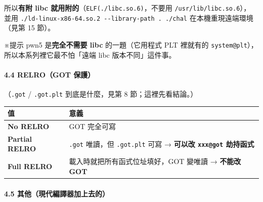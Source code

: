 \documentclass[10pt,a4paper]{article}
\newcounter{none}
\renewenvironment{quote}{%
  \begin{mdframed}[linewidth=0pt,innerleftmargin=0pt,innerrightmargin=0pt,
    innerbottommargin=0pt,innertopmargin=0pt,skipabove=0.55em,skipbelow=0.55em,
    leftmargin=0.9em,rightmargin=0.4em,startcode={\color{quotebar}\vrule width 2.6pt},%
    endcode={}]%
  \itshape\color{black}%
}{%
  \end{mdframed}%
}
\begin{document}
所以\textbf{有附 libc
就用附的}（\texttt{ELF(\textquotesingle{}\allowbreak{}./\allowbreak{}libc.\allowbreak{}so.\allowbreak{}6\textquotesingle{}\allowbreak{})}，不要用
\texttt{/\allowbreak{}usr/\allowbreak{}lib/\allowbreak{}libc.\allowbreak{}so.\allowbreak{}6}）， 並用
\texttt{./\allowbreak{}ld-\allowbreak{}linux-\allowbreak{}x86-\allowbreak{}64.\allowbreak{}so.\allowbreak{}2\ \allowbreak{}-\allowbreak{}\/\allowbreak{}-\allowbreak{}library-\allowbreak{}path\ \allowbreak{}.\allowbreak{}\ \allowbreak{}./\allowbreak{}chal}
在本機重現遠端環境（見第 15 節）。

\begin{quote}
※提示 pwn5 是\textbf{完全不需要 libc} 的一題（它用程式 PLT 裡就有的
\texttt{system@plt}）， 所以本系列裡它最不怕「遠端 libc
版本不同」這件事。
\end{quote}

\paragraph{4.4 RELRO（GOT 保護）}\label{relrogot-ux4fddux8b77}

（\texttt{.\allowbreak{}got} / \texttt{.\allowbreak{}got.\allowbreak{}plt} 到底是什麼，見第 8
節；這裡先看結論。）

{\def\LTcaptype{none} %
\begin{longtable}[]{@{}
  >{\raggedright\arraybackslash}p{}
  >{\raggedright\arraybackslash}p{}@{}}
\toprule\noalign{}
\begin{minipage}[b]{\linewidth}\raggedright
值
\end{minipage} & \begin{minipage}[b]{\linewidth}\raggedright
意義
\end{minipage} \\
\midrule\noalign{}
\endhead
\bottomrule\noalign{}
\endlastfoot
\textbf{No RELRO} & GOT 完全可寫 \\
\textbf{Partial RELRO} & \texttt{.\allowbreak{}got} 唯讀，但 \texttt{.\allowbreak{}got.\allowbreak{}plt} 可寫 →
\textbf{可以改 \texttt{xxx@got} 劫持函式} \\
\textbf{Full RELRO} & 載入時就把所有函式位址填好，GOT 變唯讀 →
\textbf{不能改 GOT} \\
\end{longtable}
}

\paragraph{4.5
其他（現代編譯器加上去的）}\label{ux5176ux4ed6ux73feux4ee3ux7de8ux8b6fux5668ux52a0ux4e0aux53bbux7684}
\end{document}
